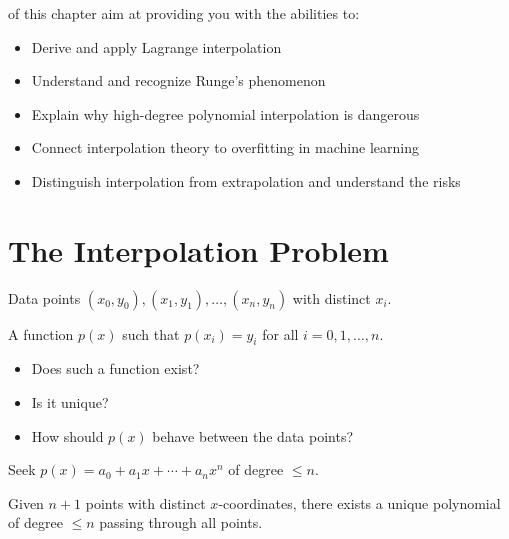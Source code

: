 \vspace{2.5em}
 of this chapter aim at providing you with the abilities to:
\begin{itemize}
    \item Derive and apply Lagrange interpolation
    \item Understand and recognize Runge's phenomenon
    \item Explain why high-degree polynomial interpolation is dangerous
    \item Connect interpolation theory to overfitting in machine learning
    \item Distinguish interpolation from extrapolation and understand the risks
\end{itemize}





\newpage
\section{The Interpolation Problem}

 Data points $(x_0, y_0), (x_1, y_1), \ldots, (x_n, y_n)$ with distinct $x_i$.

 A function $p(x)$ such that $p(x_i) = y_i$ for all $i = 0, 1, \ldots, n$.

\begin{itemize}
    \item Does such a function exist?
    \item Is it unique?
    \item How should $p(x)$ behave between the data points?
\end{itemize}

 Seek $p(x) = a_0 + a_1 x + \cdots + a_n x^n$ of degree $\leq n$.

\begin{theorem}
Given $n+1$ points with distinct $x$-coordinates, there exists a unique polynomial of degree $\leq n$ passing through all points.
\end{theorem}





